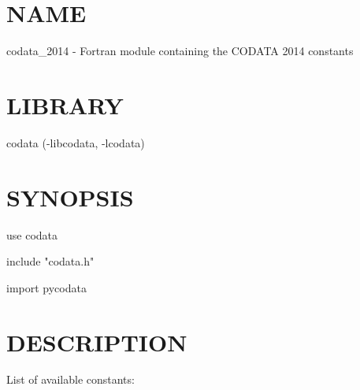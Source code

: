 \section*{NAME}
codata\_2014 - Fortran module containing the CODATA 2014 constants

\section*{LIBRARY}
codata (-libcodata, -lcodata)

\section*{SYNOPSIS}
{\ttfamily
use codata

include "codata.h"

import pycodata

}
\section*{DESCRIPTION}
List of available constants:

